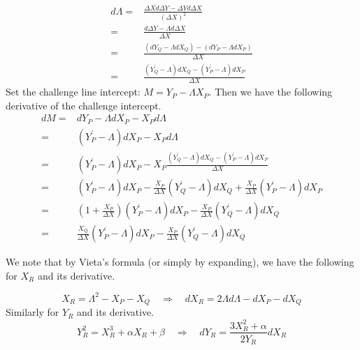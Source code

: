 \documentclass[11pt,letterpaper]{article}
\theoremstyle{definition}
\newcommand{\6}{\mathbf}
\newcommand{\7}{\mathcal}
\begin{document}

\begin{align}
d\Lambda =& \frac{\Delta X d \Delta Y - \Delta Y d \Delta X}{(\Delta X)^2} \nonumber \\
=& \frac{d\Delta Y - \Lambda d \Delta X}{\Delta X} \nonumber \\
 =& \frac{(dY_Q - \Lambda dX_Q) - (dY_P - \Lambda dX_P)}{\Delta X} \nonumber \\
=& \frac{\left(Y^\prime_Q - \Lambda\right)dX_Q - \left(Y^\prime_P - \Lambda\right)dX_P}{\Delta X} \label{dBigLambda}
\end{align}
Set the challenge line intercept: $M = Y_P - \Lambda X_P \label{bigM}$.
Then we have the following derivative of the challenge intercept.
\begin{align}
dM =& dY_P - \Lambda dX_P - X_P d\Lambda \nonumber \\
=& \left(Y_P^\prime - \Lambda\right) dX_P - X_P d\Lambda \nonumber \\
=& \left(Y_P^\prime - \Lambda\right) dX_P - X_P\frac{\left(Y_Q^\prime - \Lambda\right)dX_Q - \left(Y_P^\prime - \Lambda\right)dX_P}{\Delta X} \nonumber \\
=& \left(Y_P^\prime - \Lambda\right) dX_P - \frac{X_P}{\Delta X} \left(Y_Q^\prime - \Lambda\right)dX_Q + \frac{X_P}{\Delta X}\left(Y_P^\prime - \Lambda\right)dX_P \nonumber \\
=& \left(1+\frac{X_P}{\Delta X}\right)\left(Y_P^\prime - \Lambda\right) dX_P - \frac{X_P}{\Delta X} \left(Y_Q^\prime - \Lambda\right)dX_Q \nonumber \\
=& \frac{X_Q}{\Delta X}\left(Y_P^\prime - \Lambda\right) dX_P - \frac{X_P}{\Delta X} \left(Y_Q^\prime - \Lambda\right)dX_Q \label{dBigM}
\end{align}


We note that by Vieta's formula (or simply by expanding), we have the following for $X_R$ and its derivative.

$$X_R = \Lambda^2 - X_P - X_Q \quad \Rightarrow \quad dX_R = 2\Lambda d\Lambda - dX_P - dX_Q \label{dxr}$$
Similarly for $Y_R$ and its derivative.
$$Y_R^2 = X_R^3 + \alpha X_R + \beta \quad \Rightarrow \quad dY_R = \frac{3X_R^2 + \alpha}{2Y_R} dX_R \label{dyr}$$
\end{document}
